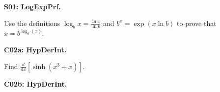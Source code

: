 \documentclass[12pt]{article}
\newcommand{\csch}{\operatorname{csch}}
\newcommand{\sech}{\operatorname{sech}}
\newcommand{\<}{\left\langle}
\renewcommand{\>}{\right\rangle}
\newcommand{\exerciseHeader}[4]{


  \vspace{0.5em}
  \textbf{#2}
  \vspace{0.5em}

}
\begin{document}
\begin{multicols}{2}
%

%

\exerciseHeader{2017 June 07}{S01: LogExpPrf.}{
Derive properties of the logarithmic and exponential functions from their definitions.
}{3/3}

Use the definitions
\( \log_b x = \frac{\ln x}{\ln b} \) and \(b^x = \exp(x\ln b)\)
to prove that \( x = b^{\log_b(x)} \).



%
%
%
%

%
%
%
%

%
%
%
%

%

%

\exerciseHeader{2017 June 09}{C02a: HypDerInt.}{
Find derivatives and integrals involving hypberbolic functions.
}{4/4}

Find \(\frac{d}{dx}[\sinh(x^3+x)].\)

\exerciseHeader{2017 June 09}{C02b: HypDerInt.}{
Find derivatives and integrals involving hypberbolic functions.
}{4/4}


\end{multicols}
\end{document}
